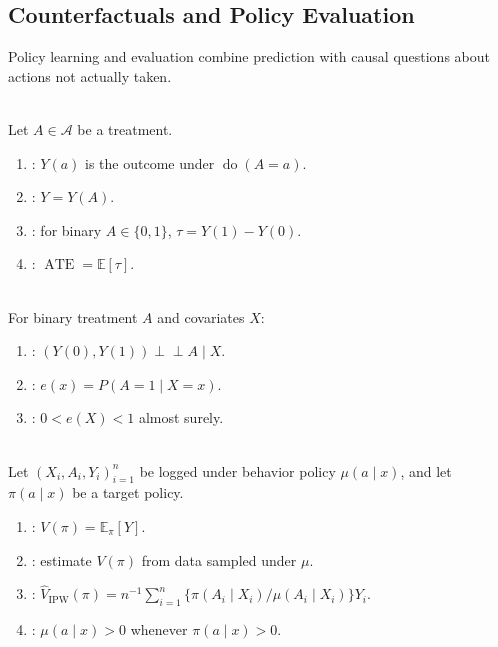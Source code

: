 \subsection{Counterfactuals and Policy Evaluation}

Policy learning and evaluation combine prediction with causal questions about actions not actually taken.

\begin{definition} \label{def:sl-potential-outcomes} \\
Let $A\in\mathcal A$ be a treatment.
\begin{enumerate}[label=(\roman*)]
\setlength{\itemsep}{0pt}
\item {}: $Y(a)$ is the outcome under $\operatorname{do}(A=a)$.
\item {}: $Y=Y(A)$.
\item {}: for binary $A\in\{0,1\}$, $\tau=Y(1)-Y(0)$.
\item {}: $\operatorname{ATE}=\mathbb E[\tau]$.
\end{enumerate}
\end{definition}

\begin{definition} \label{def:sl-ignorability-propensity} \\
For binary treatment $A$ and covariates $X$:
\begin{enumerate}[label=(\roman*)]
\setlength{\itemsep}{0pt}
\item {}: $(Y(0),Y(1))\perp\!\!\!\perp A\mid X$.
\item {}: $e(x)=P(A=1\mid X=x)$.
\item {}: $0<e(X)<1$ almost surely.
\end{enumerate}
\end{definition}

\begin{definition} \label{def:sl-off-policy-evaluation} \\
Let $(X_i,A_i,Y_i)_{i=1}^n$ be logged under behavior policy $\mu(a\mid x)$, and let $\pi(a\mid x)$ be a target policy.
\begin{enumerate}[label=(\roman*)]
\setlength{\itemsep}{0pt}
\item {}: $V(\pi)=\mathbb E_\pi[Y]$.
\item {}: estimate $V(\pi)$ from data sampled under $\mu$.
\item {}: $\hat V_{\operatorname{IPW}}(\pi)=n^{-1}\sum_{i=1}^n \{\pi(A_i\mid X_i)/\mu(A_i\mid X_i)\}Y_i$.
\item {}: $\mu(a\mid x)>0$ whenever $\pi(a\mid x)>0$.
\end{enumerate}
\end{definition}


